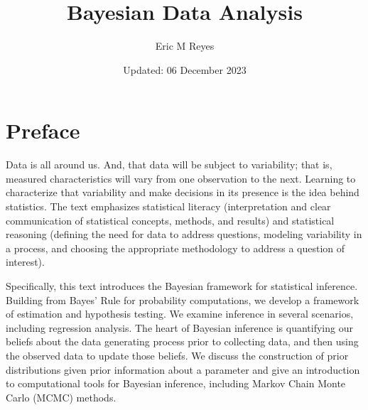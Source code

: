 \documentclass[
  letterpaper,
  DIV=11,
  numbers=noendperiod]{scrreprt}
\title{Bayesian Data Analysis}
\author{Eric M Reyes}
\date{Updated: 06 December 2023}
\renewcommand*\contentsname{Table of contents}
\newcommand\contentsname{Table of contents}
\theoremstyle{definition}
\theoremstyle{definition}
\theoremstyle{plain}
\theoremstyle{remark}
\begin{document}
\maketitle
\ifdefined\Shaded\renewenvironment{Shaded}{\begin{tcolorbox}[sharp corners, frame hidden, breakable, interior hidden, boxrule=0pt, enhanced, borderline west={3pt}{0pt}{shadecolor}]}{\end{tcolorbox}}\fi

\renewcommand*\contentsname{Table of contents}
{
\hypersetup{linkcolor=}
\setcounter{tocdepth}{2}
\tableofcontents
}

\hypertarget{preface}{%
\chapter*{Preface}\label{preface}}


\providecommand{\norm}[1]{\lVert#1\rVert}
\providecommand{\abs}[1]{\lvert#1\rvert}
\providecommand{\iid}{\stackrel{\text{IID}}{\sim}}
\providecommand{\ind}{\stackrel{\text{Ind}}{\sim}}

\providecommand{\bm}[1]{\mathbf{#1}}
\providecommand{\bs}[1]{\boldsymbol{#1}}
\providecommand{\bbeta}{\bs{\beta}}

\providecommand{\Ell}{\mathcal{L}}
\providecommand{\indep}{\perp\negthickspace\negmedspace\perp}

Data is all around us. And, that data will be subject to variability;
that is, measured characteristics will vary from one observation to the
next. Learning to characterize that variability and make decisions in
its presence is the idea behind statistics. The text emphasizes
statistical literacy (interpretation and clear communication of
statistical concepts, methods, and results) and statistical reasoning
(defining the need for data to address questions, modeling variability
in a process, and choosing the appropriate methodology to address a
question of interest).

Specifically, this text introduces the Bayesian framework for
statistical inference. Building from Bayes' Rule for probability
computations, we develop a framework of estimation and hypothesis
testing. We examine inference in several scenarios, including regression
analysis. The heart of Bayesian inference is quantifying our beliefs
about the data generating process prior to collecting data, and then
using the observed data to update those beliefs. We discuss the
construction of prior distributions given prior information about a
parameter and give an introduction to computational tools for Bayesian
inference, including Markov Chain Monte Carlo (MCMC) methods.
\end{document}
